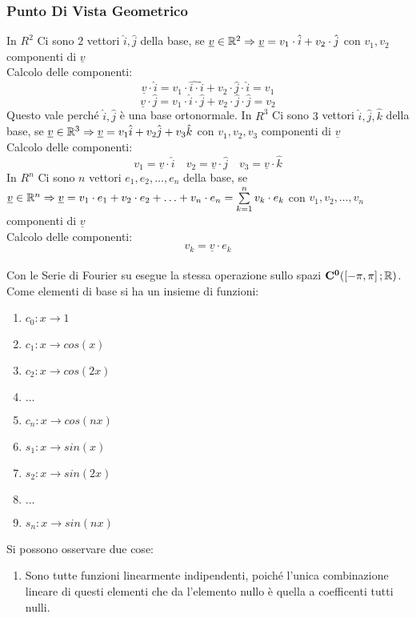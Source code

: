 \subsubsection{Punto Di Vista Geometrico}
In $R^2$ Ci sono $2$ vettori $\hat{i},\hat{j}$ della base, se $\underline{v}\in \mathbb{R}^2 \Rightarrow \underline{v}=v_1\cdot \hat{i}+v_2\cdot \hat{j}$ con $v_1,v_2$ componenti di $\underline{v}$\\
Calcolo delle componenti:\\
$$\underline{v}\cdot \hat{i} = v_1\cdot \hat{i\cdot }\hat{i}+v_2\cdot \hat{j}\cdot \hat{i}=v_1$$
$$\underline{v}\cdot \hat{j} = v_1\cdot \hat{i}\cdot \hat{j}+v_2\cdot \hat{j}\cdot \hat{j}=v_2$$
Questo vale perché $\hat{i},\hat{j}$ è una base ortonormale.
In $R^3$ Ci sono $3$ vettori $\hat{i},\hat{j},\hat{k}$ della base, se $\underline{v}\in \mathbb{R}^3 \Rightarrow \underline{v}=v_1\hat{i}+v_2\hat{j}+v_3\hat{k}$ con $v_1,v_2,v_3$ componenti di $\underline{v}$\\
Calcolo delle componenti:
$$ v_1=\underline{v}\cdot \hat{i}\quad v_2=\underline{v}\cdot \hat{j}\quad v_3=\underline{v}\cdot \hat{k}  $$
In $R^n$ Ci sono $n$ vettori $e_1,e_2,\dotsc,e_n$ della base, se $\underline{v}\in \mathbb{R}^n \Rightarrow \underline{v}=v_1\cdot e_1+v_2\cdot e_2+\ldots+v_n\cdot e_n=\sum\limits_{k=1}^{n}v_k\cdot e_k$ con $v_1,v_2,\dotsc,v_n$ componenti di $\underline{v}$\\
Calcolo delle componenti:
$$v_k=\underline{v}\cdot e_k$$
\\
Con le Serie di Fourier su esegue la stessa operazione sullo spazi $\mathbf{C^{0}}(\left[-\pi,\pi\right]; \mathbb{R})$. Come elementi di base si ha un insieme di funzioni:
\begin{enumerate}
	\item $c_0:x\to 1$
	\item $c_1:x\to cos(x)$
	\item $c_2:x\to cos(2x)$
	\item $\ldots$
	\item $c_n:x\to cos(nx)$
	\item $s_1:x\to sin(x)$
	\item $s_2:x\to sin(2x)$
	\item $\ldots$
	\item $s_n:x\to sin(nx)$
\end{enumerate}
Si possono osservare due cose:
\begin{enumerate}
	\item Sono tutte funzioni linearmente indipendenti, poiché l'unica combinazione lineare di questi elementi che da l'elemento nullo è quella a coefficenti tutti nulli.
\end{enumerate}
